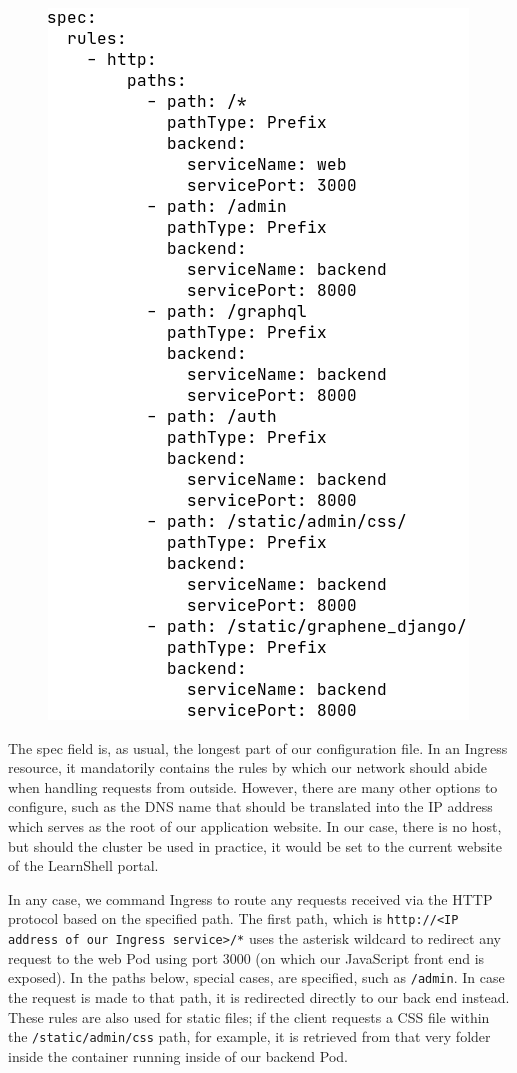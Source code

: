 \documentclass[thesis=B,english]{FITthesis}[2019/12/23]
\begin{document}
\begin{figure}[H]
\centering
\hspace*{0.7cm}
\includegraphics[scale=0.5]{kube-ingress2}
\end{figure}

The spec field is, as usual, the longest part of our configuration file. In an Ingress resource, it mandatorily contains the rules by which our network should abide when handling requests from outside. However, there are many other options to configure, such as the DNS name that should be translated into the IP address which serves as the root of our application website. In our case, there is no host, but should the cluster be used in practice, it would be set to the current website of the LearnShell portal.

In any case, we command Ingress to route any requests received via the HTTP protocol based on the specified path. The first path, which is \verb|http://<IP address of our Ingress service>/*| uses the asterisk wildcard to redirect any request to the web Pod using port 3000 (on which our JavaScript front end is exposed). In the paths below, special cases, are specified, such as \verb|/admin|. In case the request is made to that path, it is redirected directly to our back end instead. These rules are also used for static files; if the client requests a CSS file within the \verb|/static/admin/css| path, for example, it is retrieved from that very folder inside the container running inside of our backend Pod.
\end{document}
